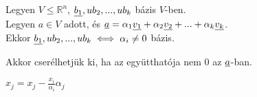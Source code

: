 	\begin{frame}
		\begin{tcolorbox}[title={Tétel.: Bázistransformáció}]
			Legyen $V \leq \mathbb{R}^n$, $\underline{b_1}, u{b_2}, ..., u{b_k}$ bázis $V$-ben.\\
			Legyen $a \in V$ adott, és $\underline{a} = {\alpha}_1\underline{v_1} +  {\alpha}_2\underline{v_2} +  ... + {\alpha}_k\underline{v_k}$.\\
			Ekkor $\underline{b_1}, u{b_2}, ..., u{b_k} \iff {\alpha}_i \neq 0$ bázis.\\
			\mmedskip
			
			Akkor cserélhetjük ki, ha az együtthatója nem 0 az $\underline{a}$-ban.
		\end{tcolorbox}
		
		\begin{tcolorbox}[title={Képlet}]
			$x_j = x_j - \frac{x_i}{{{\alpha}_i}} {\alpha}_j$
		\end{tcolorbox}
		
		\begin{tcolorbox}[title={Öf táblázat}]
		\end{tcolorbox}
	\end{frame}
	
